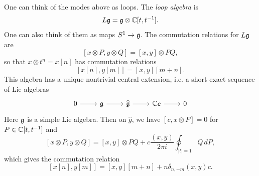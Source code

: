 \begin{remark}
  One can think of the modes above as
  loops. The \emph{loop algebra} is
  \[
    L \mathfrak{g} = \mathfrak{g} \otimes \mathbb{C}[t, t^{-1}].
  \]
  One can also think of them as maps
  $S^1 \to \mathfrak{g}$. The commutation relations
  for $L \mathfrak{g}$ are
  \[
    [x \otimes P, y \otimes Q]
    = [x, y] \otimes PQ,
  \]
  so that $x \otimes t^n = x[n]$ has
  commutation relations
  \[
    [x[n], y[m]] = [x, y][m + n].
  \]
  This algebra has a unique nontrivial central
  extension, i.e. a short exact sequence of
  Lie algebras
  \[
    \begin{tikzcd}
      0 \ar[r] & \g \ar[r] & \widehat{\g}
      \ar[r] & \C c \ar[r] & 0
    \end{tikzcd}
  \]
  Here $\mathfrak{g}$ is a simple Lie algebra. Then
  on $\widehat{g}$, we have
  $[c, x \otimes P] = 0$ for
  $P \in \mathbb{C}[t, t^{-1}]$ and
  \[
    [x \otimes P, y \otimes Q]
    = [x, y] \otimes PQ
    + c \frac{(x, y)}{2\pi i} \oint_{|t| = 1}Q\, dP,
  \]
  which gives the commutation relation
  \[
    [x[n], y[m]] = [x, y][m + n]
    + n \delta_{n, -m} (x, y) c.
  \]
\end{remark}

